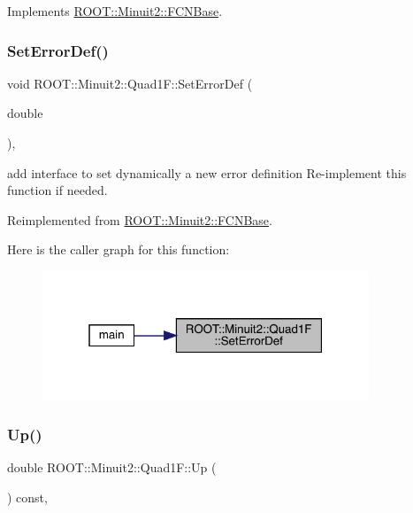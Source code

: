 Implements \mbox{\hyperlink{classROOT_1_1Minuit2_1_1FCNBase_ae4a86bd94d0d0f5ca6fc8f8ab2bb43cd}{R\+O\+O\+T\+::\+Minuit2\+::\+F\+C\+N\+Base}}.

\mbox{\label{classROOT_1_1Minuit2_1_1Quad1F_a086ed11e56374ff0331676d7eac34395}} 
\subsubsection{\texorpdfstring{SetErrorDef()}{SetErrorDef()}}
{\footnotesize\ttfamily void R\+O\+O\+T\+::\+Minuit2\+::\+Quad1\+F\+::\+Set\+Error\+Def (\begin{DoxyParamCaption}\item[{double}]{ }\end{DoxyParamCaption})\hspace{0.3cm}{\ttfamily [inline]}, {\ttfamily [virtual]}}

add interface to set dynamically a new error definition Re-\/implement this function if needed. 

Reimplemented from \mbox{\hyperlink{classROOT_1_1Minuit2_1_1FCNBase_a840e02c2e6ef96eec289deca096b6088}{R\+O\+O\+T\+::\+Minuit2\+::\+F\+C\+N\+Base}}.

Here is the caller graph for this function\+:\nopagebreak
\begin{figure}[H]
\begin{center}
\leavevmode
\includegraphics[width=277pt]{d9/de8/classROOT_1_1Minuit2_1_1Quad1F_a086ed11e56374ff0331676d7eac34395_icgraph}
\end{center}
\end{figure}
\mbox{\label{classROOT_1_1Minuit2_1_1Quad1F_a14469d6031751fa382120df6327da5ee}} 
\subsubsection{\texorpdfstring{Up()}{Up()}}
{\footnotesize\ttfamily double R\+O\+O\+T\+::\+Minuit2\+::\+Quad1\+F\+::\+Up (\begin{DoxyParamCaption}{ }\end{DoxyParamCaption}) const\hspace{0.3cm}{\ttfamily [inline]}, {\ttfamily [virtual]}}

